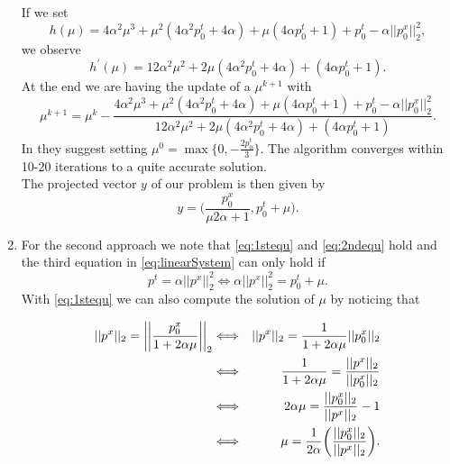 \begin{enumerate}
        If we set
        $$
            h(\mu) = 4 \alpha^{2} \mu^{3} + \mu^{2} (4 \alpha^{2} p_{0}^{t} + 4 \alpha) + \mu(4 \alpha p_{0}^{t} + 1) + p_{0}^{t} - \alpha ||p_{0}^{x}||_{2}^{2},
        $$
        we observe
        $$
            h^{'}(\mu) = 12 \alpha^{2} \mu^{2} + 2 \mu (4 \alpha^{2} p_{0}^{t} + 4 \alpha) + (4 \alpha p_{0}^{t} + 1).
        $$
        At the end we are having the update of a $\mu^{k+1}$ with
        \begin{equation}
            \mu^{k+1} = \mu^{k} - \frac{4 \alpha^{2} \mu^{3} + \mu^{2} (4 \alpha^{2} p_{0}^{t} + 4 \alpha) + \mu(4 \alpha p_{0}^{t} + 1) + p_{0}^{t} - \alpha ||p_{0}^{x}||_{2}^{2}}{12 \alpha^{2} \mu^{2} + 2 \mu (4 \alpha^{2} p_{0}^{t} + 4 \alpha) + (4 \alpha p_{0}^{t} + 1)}.
        \end{equation}
        In \cite{Chambolle-et-al-10} they suggest setting $\mu^{0} = \max \{ 0, - \frac{2 p_{0}^{t}}{3} \}$. The algorithm converges within 10-20 iterations to a quite accurate solution.\\
        The projected vector $y$ of our problem is then given by
        \begin{equation}
            y = \bigg( \frac{p_{0}^{x}}{\mu 2 \alpha + 1}, p_{0}^{t} + \mu \bigg). \label{eq:newtonSolution}
        \end{equation}

        \item For the second approach we note that \ref{eq:1stequ} and \ref{eq:2ndequ} hold and the third equation in \ref{eq:linearSystem} can only hold if
        \begin{equation}
            p^{t} = \alpha ||p^{x}||_{2}^{2} \Longleftrightarrow \alpha ||p^{x}||_{2}^{2} = p_{0}^{t} + \mu. \label{eq:tmp1}
        \end{equation}
        With \ref{eq:1stequ} we can also compute the solution of $\mu$ by noticing that

        \begin{eqnarray}
            ||p^{x}||_{2} = \bigg|\bigg| \frac{p_{0}^{x}}{1 + 2 \alpha \mu} \bigg|\bigg|_{2} &\Longleftrightarrow& ||p^{x}||_{2} = \frac{1}{1 + 2 \alpha \mu} ||p_{0}^{x}||_{2} \notag \\
            &\Longleftrightarrow& \frac{1}{1 + 2 \alpha \mu} = \frac{||p^{x}||_{2}}{||p_{0}^{x}||_{2}} \notag \\
            &\Longleftrightarrow& 2 \alpha \mu = \frac{||p_{0}^{x}||_{2}}{||p^{x}||_{2}} - 1 \notag \\
            &\Longleftrightarrow& \mu = \frac{1}{2 \alpha} \bigg( \frac{||p_{0}^{x}||_{2}}{||p^{x}||_{2}} \bigg). \notag
        \end{eqnarray}


\end{enumerate}
